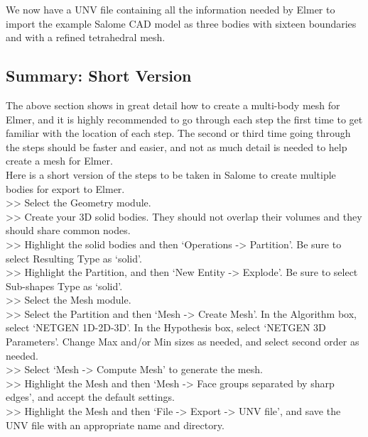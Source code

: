 We now have a UNV file containing all the information needed by Elmer to import the example Salome CAD model as three bodies with sixteen boundaries and with a refined tetrahedral mesh.

\subsection{Summary: Short Version}

The above section shows in great detail how to create a multi-body mesh for Elmer, and it is highly recommended to go through each step the first time to get familiar with the location of each step.  The second or third time going through the steps should be faster and easier, and not as much detail is needed to help create a mesh for Elmer.\\

\noindent Here is a short version of the steps to be taken in Salome to create multiple bodies for export to Elmer.\\

>> Select the Geometry module.\\

>> Create your 3D solid bodies.  They should not overlap their volumes and they should share common nodes.\\

>> Highlight the solid bodies and then `Operations -> Partition'.  Be sure to select Resulting Type as `solid'.\\

>> Highlight the Partition, and then `New Entity -> Explode'.  Be sure to select Sub-shapes Type as `solid'.\\

>> Select the Mesh module.\\

>> Select the Partition and then `Mesh -> Create Mesh'.  In the Algorithm box, select `NETGEN 1D-2D-3D'.  In the Hypothesis box, select `NETGEN 3D Parameters'.  Change Max and/or Min sizes as needed, and select second order as needed.\\

>> Select `Mesh -> Compute Mesh' to generate the mesh.\\

>> Highlight the Mesh and then `Mesh -> Face groups separated by sharp edges', and accept the default settings.\\

>> Highlight the Mesh and then `File -> Export -> UNV file', and save the UNV file with an appropriate name and directory.\\

